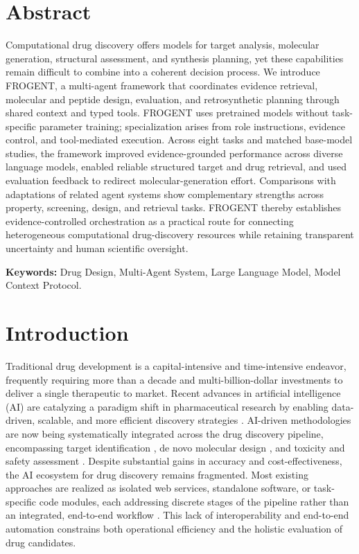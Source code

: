 \documentclass{article}
\newcommand{\keywords}[1]{\textbf{Keywords:} #1}
\begin{document}
\linenumbers
\maketitle

{
\section*{Abstract}
Computational drug discovery offers models for target analysis, molecular generation, structural assessment, and synthesis planning, yet these capabilities remain difficult to combine into a coherent decision process. We introduce FROGENT, a multi-agent framework that coordinates evidence retrieval, molecular and peptide design, evaluation, and retrosynthetic planning through shared context and typed tools. FROGENT uses pretrained models without task-specific parameter training; specialization arises from role instructions, evidence control, and tool-mediated execution. Across eight tasks and matched base-model studies, the framework improved evidence-grounded performance across diverse language models, enabled reliable structured target and drug retrieval, and used evaluation feedback to redirect molecular-generation effort. Comparisons with adaptations of related agent systems show complementary strengths across property, screening, design, and retrieval tasks. FROGENT thereby establishes evidence-controlled orchestration as a practical route for connecting heterogeneous computational drug-discovery resources while retaining transparent uncertainty and human scientific oversight.

\keywords{Drug Design, Multi-Agent System, Large Language Model, Model Context Protocol.}
}

\section*{Introduction}
Traditional drug development is a capital-intensive and time-intensive endeavor, frequently requiring more than a decade and multi-billion-dollar investments to deliver a single therapeutic to market. Recent advances in artificial intelligence (AI) are catalyzing a paradigm shift in pharmaceutical research by enabling data-driven, scalable, and more efficient discovery strategies \cite{sadybekov2023computational}. AI-driven methodologies are now being systematically integrated across the drug discovery pipeline, encompassing target identification \cite{pun2023ai}, de novo molecular design \cite{zhang2024deep}, and toxicity and safety assessment \cite{wilde2024implementation}. Despite substantial gains in accuracy and cost-effectiveness, the AI ecosystem for drug discovery remains fragmented. Most existing approaches are realized as isolated web services, standalone software, or task-specific code modules, each addressing discrete stages of the pipeline rather than an integrated, end-to-end workflow \cite{zhang2025artificial}. This lack of interoperability and end-to-end automation constrains both operational efficiency and the holistic evaluation of drug candidates.
\end{document}
